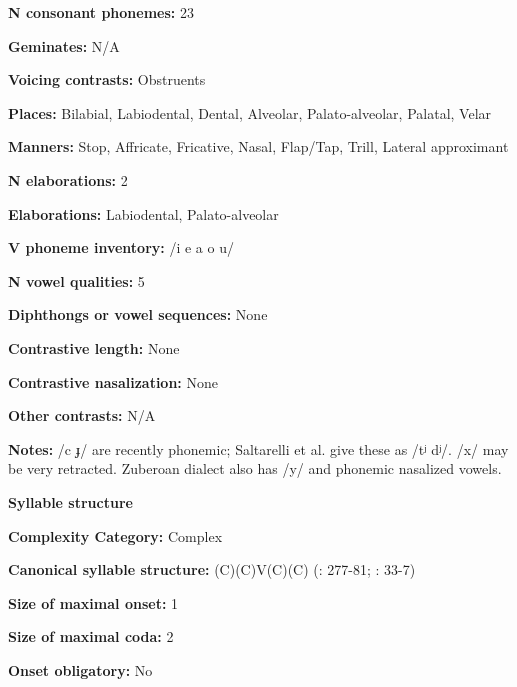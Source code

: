 \textbf{N consonant phonemes:} 23



\textbf{Geminates:} N/A



\textbf{Voicing contrasts:} Obstruents



\textbf{Places:} Bilabial, Labiodental, Dental, Alveolar, Palato-alveolar, Palatal, Velar



\textbf{Manners:} Stop, Affricate, Fricative, Nasal, Flap/Tap, Trill, Lateral approximant



\textbf{N elaborations:} 2



\textbf{Elaborations:} Labiodental, Palato-alveolar



\textbf{V phoneme inventory:} /i e a o u/



\textbf{N vowel qualities:} 5



\textbf{Diphthongs or vowel sequences:} None



\textbf{Contrastive length:} None



\textbf{Contrastive nasalization:} None



\textbf{Other contrasts:} N/A



\textbf{Notes:} /c ɟ/ are recently phonemic; Saltarelli et al. give these as /tʲ dʲ/. /x/ may be very retracted. Zuberoan dialect also has /y/ and phonemic nasalized vowels.



\textbf{Syllable structure}



\textbf{Complexity Category:} Complex



\textbf{Canonical syllable structure:} (C)(C)V(C)(C) (\citealt{SaltarelliEtAl1988}: 277-81; \citealt{Hualde2003}: 33-7)



\textbf{Size of maximal onset:} 1



\textbf{Size of maximal coda:} 2



\textbf{Onset obligatory:} No



